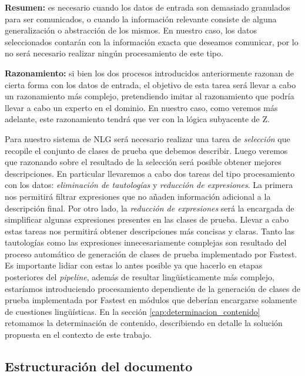 \bigskip
\noindent
\textbf{Resumen:} es necesario cuando los datos de entrada son demasiado granulados para ser comunicados, o cuando la información relevante consiste de alguna generalización o abstracción de los mismos. En nuestro caso, los datos seleccionados contarán con la información exacta que deseamos comunicar, por lo no será necesario realizar ningún procesamiento de este tipo.

\bigskip
\noindent
\textbf{Razonamiento:} si bien los dos procesos introducidos anteriormente razonan de cierta forma con los datos de entrada, el objetivo de esta tarea será llevar a cabo un razonamiento más complejo, pretendiendo imitar al razonamiento que podría llevar a cabo un experto en el dominio. En nuestro caso, como veremos más adelante, este razonamiento tendrá que ver con la lógica subyacente de Z.

\bigskip
Para nuestro sistema de NLG será necesario realizar una tarea de \emph{selección} que recopile el conjunto de clases de prueba que debemos describir. Luego veremos que razonando sobre el resultado de la selección será posible obtener mejores descripciones. En particular llevaremos a cabo dos tareas del tipo procesamiento con los datos: \emph{eliminación de tautologías} y \emph{reducción de expresiones}. La primera nos permitirá filtrar expresiones que no añaden información adicional a la descripción final. Por otro lado, la \emph{reducción de expresiones} será la encargada de simplificar algunas expresiones presentes en las clases de prueba. Llevar a cabo estas tareas nos permitirá obtener descripciones más concisas y claras. Tanto las tautologías como las expresiones innecesariamente complejas son resultado del proceso automático de generación de clases de prueba implementado por Fastest. Es importante lidiar con estas lo antes posible ya que hacerlo en etapas posteriores del \textit{pipeline}, además de resultar lingüísticamente más complejo, estaríamos introduciendo procesamiento dependiente de la generación de clases de prueba implementada por Fastest en módulos que deberían encargarse solamente de cuestiones lingüísticas. En la sección \ref{cap:determinacion_contenido} retomamos la determinación de contenido, describiendo en detalle la solución propuesta en el contexto de este trabajo.

\subsection*{Estructuración del documento}

